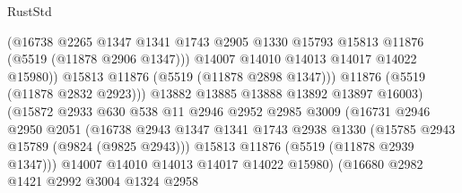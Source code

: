 \begin{lexlean}{RustStd}
\begin{coremodule}
                                    (@16738
                                      @2265
                                      @1347
                                      @1341
                                      @1743
                                      @2905
                                      @1330
                                      @15793
                                      @15813
                                      @11876
                                      (@5519 (@11878 @2906 @1347)))
                                    @14007
                                    @14010
                                    @14013
                                    @14017
                                    @14022
                                    @15980))
                                @15813
                                @11876
                                (@5519 (@11878 @2898 @1347)))
                              @11876
                              (@5519 (@11878 @2832 @2923)))
                            @13882
                            @13885
                            @13888
                            @13892
                            @13897
                            @16003)
                          (@15872
                            @2933
                            @630
                            @538
                            @11
                            @2946
                            @2952
                            @2985
                            @3009
                            (@16731
                              @2946
                              @2950
                              @2051
                              (@16738
                                @2943
                                @1347
                                @1341
                                @1743
                                @2938
                                @1330
                                (@15785 @2943 @15789 (@9824 (@9825 @2943)))
                                @15813
                                @11876
                                (@5519 (@11878 @2939 @1347)))
                              @14007
                              @14010
                              @14013
                              @14017
                              @14022
                              @15980)
                            (@16680
                              @2982
                              @1421
                              @2992
                              @3004
                              @1324
                              @2958

\end{coremodule}
\end{lexlean}
